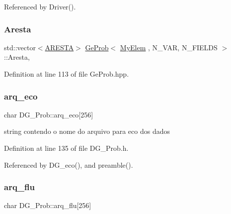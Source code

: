 Referenced by Driver().

\mbox{\label{classGeProb_af82bffefd5e8fe33dec7ef5b8098a9b4}} 
\subsubsection{\texorpdfstring{Aresta}{Aresta}}
{\footnotesize\ttfamily std\+::vector$<$\hyperlink{structARESTA}{A\+R\+E\+S\+TA}$>$ \hyperlink{classGeProb}{Ge\+Prob}$<$ \hyperlink{DG__Prob_8h_a83cd887ced9a6587428f267e50cd4787}{My\+Elem} , N\+\_\+\+V\+AR, N\+\_\+\+F\+I\+E\+L\+DS $>$\+::Aresta\hspace{0.3cm}{\ttfamily [protected]}, {\ttfamily [inherited]}}



Definition at line 113 of file Ge\+Prob.\+hpp.

\mbox{\label{classDG__Prob_a42e2ae0c75d2745012cd74f276b600a0}} 
\subsubsection{\texorpdfstring{arq\+\_\+eco}{arq\_eco}}
{\footnotesize\ttfamily char D\+G\+\_\+\+Prob\+::arq\+\_\+eco\mbox{[}256\mbox{]}\hspace{0.3cm}{\ttfamily [private]}}



string contendo o nome do arquivo para eco dos dados 



Definition at line 135 of file D\+G\+\_\+\+Prob.\+h.



Referenced by D\+G\+\_\+eco(), and preamble().

\mbox{\label{classDG__Prob_a0b3433f004931fd5f503928bf403d493}} 
\subsubsection{\texorpdfstring{arq\+\_\+flu}{arq\_flu}}
{\footnotesize\ttfamily char D\+G\+\_\+\+Prob\+::arq\+\_\+flu\mbox{[}256\mbox{]}\hspace{0.3cm}{\ttfamily [private]}}



